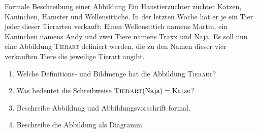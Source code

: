 \documentclass[../funktionen.tex]{subfiles}
\begin{document}
    \begin{sampleexercise}{Formale Beschreibung einer Abbildung}
        Ein Haustierzüchter züchtet Katzen, Kaninchen, Hamster und Wellensittiche. In der letzten Woche hat er je ein Tier jeder dieser Tierarten verkauft: Einen Wellensittich namens Martin, ein Kaninchen namens Andy und zwei Tiere namens Traxx und Naja. Es soll nun eine Abbildung \textsc{Tierart} definiert werden, die zu den Namen dieser vier verkauften Tiere die jeweilige Tierart angibt.
        \begin{enumerate}
            \item Welche Definitions- und Bildmenge hat die Abbildung \textsc{Tierart}?
            \item Was bedeutet die Schreibweise $\textsc{Tierart}(\text{Naja})=\text{Katze}$?
            \item Beschreibe Abbildung und Abbildungsvorschrift formal.
            \item Beschreibe die Abbildung als Diagramm.
        \end{enumerate}
    \end{sampleexercise}
\end{document}
